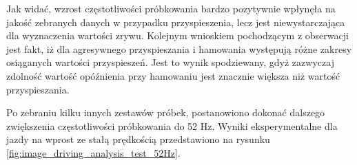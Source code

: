 \clearpage
Jak widać, wzrost częstotliwości próbkowania bardzo pozytywnie wpłynęła na jakość zebranych danych w przypadku przyspieszenia, lecz jest niewystarczająca dla wyznaczenia wartości zrywu. Kolejnym wnioskiem pochodzącym z obserwacji jest fakt, iż dla agresywnego przyspieszania i hamowania występują różne zakresy osiąganych wartości przyspieszeń. Jest to wynik spodziewany, gdyż zazwyczaj zdolność wartość opóźnienia  przy hamowaniu jest znacznie większa niż wartość przyspieszania. 

Po zebraniu kilku innych zestawów próbek, postanowiono dokonać dalszego zwiększenia częstotliwości próbkowania do 52 Hz. Wyniki eksperymentalne dla jazdy na wprost ze stałą prędkością przedstawiono na rysunku \ref{fig:image_driving_analysis_test_52Hz}.



